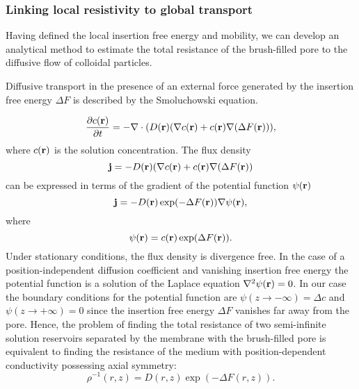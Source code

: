 \documentclass[12pt, a4paper]{article}
\begin{document}
\subsubsection{Linking local resistivity to global transport}


Having defined the local insertion free energy and mobility, we can develop an analytical method to estimate the total resistance of the brush-filled pore to the diffusive flow of colloidal particles.

Diffusive transport in the presence of an external force generated by the insertion free energy $\Delta F$ is described by the Smoluchowski equation.

\begin{equation}
    \frac{\partial c(\bold r)}{\partial t}=-{\bold \nabla}\cdot (D(\bold r)({\bold \nabla}c({\bold r})+c({\bold r}){\bold \nabla}(\Delta F({\bold  r}))),
    \label{eq:Smoluch}
\end{equation}
where $c(\bold r)$ is the solution concentration. The flux density 
\begin{equation}
    \bold j=- D(\bold r)({\bold \nabla}c({\bold r})+c({\bold r}){\bold \nabla}(\Delta F({\bold  r}))
    \label{eq:j}
\end{equation}
can be expressed in terms of the gradient of the potential function $\psi(\bold r)$
\begin{equation}
    \bold j=- D(\bold r) \exp(-\Delta F({\bold  r}))  {\bold \nabla} \psi(\bold r),
    \label{eq:psi}
\end{equation}
where
\begin{equation}
    \psi(\bold r)=c(\bold r)\exp(\Delta F(\bold r)).
    \label{eq:psi1}
\end{equation}
Under stationary conditions, the flux density is divergence free. In the case of a position-independent diffusion coefficient and vanishing insertion free energy the potential function is a solution of the Laplace equation $\nabla^2 \psi(\bold r)=0$.
In our case the boundary conditions for the potential function are $\psi(z\rightarrow -\infty)=\Delta c$ and $\psi(z\rightarrow +\infty)=0$ since the insertion free energy $\Delta F$ vanishes far away from the pore.
Hence, the problem of finding the total resistance of two semi-infinite solution reservoirs separated by the membrane with the brush-filled pore is equivalent to finding the resistance of the medium with position-dependent conductivity possessing axial symmetry:
\begin{equation}
    \rho^{-1} (r,z)= D(r,z)\exp(-\Delta F(r,z)).
    \label{eq:rho}
\end{equation}
\end{document}
